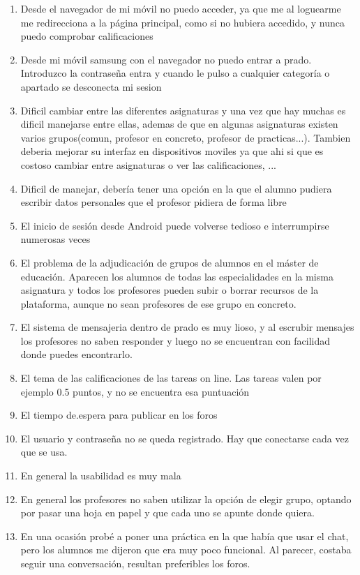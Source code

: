 \begin{enumerate}
\item Desde el navegador de mi móvil no puedo acceder, ya que me al loguearme me redirecciona a la página principal, como si no hubiera accedido, y nunca puedo comprobar calificaciones
\item Desde mi móvil samsung con el navegador no puedo entrar a prado. Introduzco la contraseña entra y cuando le pulso a cualquier categoría o apartado se desconecta mi sesion
\item Dificil cambiar entre las diferentes asignaturas y una vez que hay muchas es dificil manejarse entre ellas, ademas de que en algunas asignaturas existen varios grupos(comun, profesor en concreto, profesor de practicas...). Tambien deberia mejorar su interfaz en dispositivos moviles ya que ahi si que es costoso cambiar entre asignaturas o ver las calificaciones, ...
\item Dificil de manejar, debería tener una opción en la que el alumno pudiera escribir datos personales que el profesor pidiera de forma libre
\item El inicio de sesión desde Android puede volverse tedioso e interrumpirse numerosas veces
\item El problema de la adjudicación de grupos de alumnos en el máster de educación. Aparecen los alumnos de todas las especialidades en la misma asignatura y todos los profesores pueden subir o borrar recursos de la plataforma, aunque no sean profesores de ese grupo en concreto.
\item El sistema de mensajeria dentro de prado es muy lioso, y al escrubir mensajes los profesores no saben responder y luego no se encuentran con facilidad donde puedes encontrarlo.
\item El tema de las calificaciones de las tareas on line. Las tareas valen por ejemplo 0.5 puntos, y no se encuentra esa puntuación
\item El tiempo de.espera para publicar en los foros
\item El usuario y contraseña no se queda registrado. Hay que conectarse cada vez que se usa.
\item En general la usabilidad es muy mala
\item En general los profesores no saben utilizar la opción de elegir grupo, optando por pasar una hoja en papel y que cada uno se apunte donde quiera.
\item En una ocasión probé a poner una práctica en la que había que usar el chat, pero los alumnos me dijeron que era muy poco funcional. Al parecer, costaba seguir una conversación, resultan preferibles los foros.

\end{enumerate}
